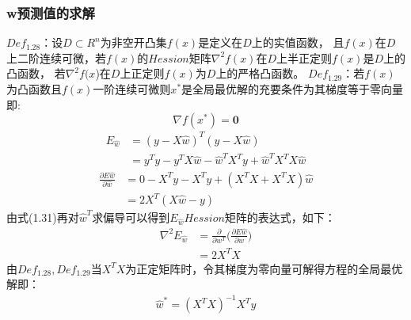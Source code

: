 \documentclass[cn,hazy,blue,14pt,normal]{elegantnote}
\begin{document}
\subsubsection{w预测值的求解}
$Def_{1.28}$：设$D\subset R^n$为非空开凸集$f(x)$是定义在$D$上的实值函数，
且$f(x)$在$D$上二阶连续可微，若$f(x)$的$Hession$矩阵$\nabla^2f(x)$在$D$上半正定则$f(x)$是$D$上的凸函数，
若$\nabla^2f(x$)在$D$上正定则$f(x)$为$D$上的严格凸函数。
$Def_{1.29}$：若$f(x)$为凸函数且$f(x)$一阶连续可微则$x^*$是全局最优解的充要条件为其梯度等于零向量即:
$$\nabla f(x^*)=\textbf{0}$$
\begin{align}E_{\hat{w}}&=(y-X\hat{w})^T(y-X\hat{w})\nonumber \\&= y^Ty-y^TX\hat{w}-\hat{w}^TX^Ty+\hat{w}^TX^TX\hat{w} \end{align}
\begin{align}\frac{\partial E\hat{w}}{\partial \hat{w}}&= 0-X^Ty-X^Ty+(X^TX+X^TX)\hat{w}\nonumber\\&=2X^T(X\hat{w}-y)\end{align}
由式(1.31)再对$\hat{w}^T$求偏导可以得到$E_{\hat{w}} Hession$矩阵的表达式，如下：
\begin{align}
  \nabla^2 E_{\hat{w}}&=\frac{\partial }{\partial w^T}\Big (\frac{\partial E\hat{w}}{\partial w}\Big) \nonumber \\ &=2X^TX 
\end{align}
由$Def_{1.28},Def_{1.29}$当$X^TX$为正定矩阵时，令其梯度为零向量可解得方程的全局最优解即：
\begin{align}
  \hat{w}^*=(X^TX)^{-1}X^Ty
\end{align}
\end{document}
